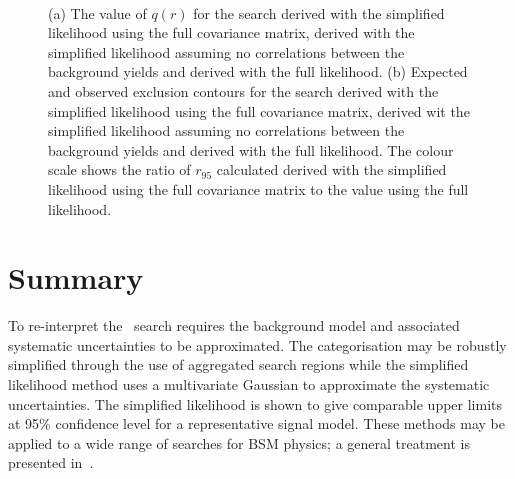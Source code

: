 \begin{figure}[]
  \begin{center} 
   ~~
   \\
   \caption{(a) The value of $q(r)$ for the \alphat search derived with the simplified 
   likelihood using the full covariance matrix, derived with the simplified likelihood 
   assuming no correlations between the background yields and 
   derived with the full likelihood. (b) Expected and observed exclusion contours for the \alphat search
   derived with the simplified likelihood using the full covariance matrix,
   derived wit the simplified likelihood assuming no correlations between the background yields
   and derived with the full likelihood. The colour scale shows the ratio of $r_{95}$ calculated 
   derived with the simplified likelihood using the full covariance matrix to the value using the full likelihood.}
   \label{fig:likelihoodscanAT} 
  \end{center}
\end{figure}

\section{Summary}

To re-interpret the \alphat~search requires the background model and associated
systematic uncertainties to be approximated. The categorisation may be
robustly simplified through the use of aggregated search regions while the simplified 
likelihood method uses a multivariate Gaussian to approximate the systematic uncertainties.
The simplified likelihood is shown to give comparable upper limits at 95\% confidence 
level for a representative signal model. These methods may be applied to a 
wide range of searches for BSM physics; a general treatment 
is presented in~\cite{simp-lik}.

